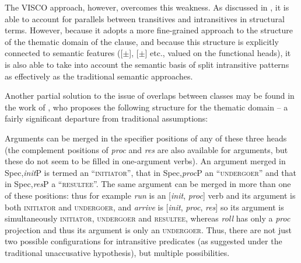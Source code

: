 \documentclass[output=paper]{langsci/langscibook}
\begin{document}
The VISCO approach, however, overcomes this weakness. As discussed in , it
is able to account for parallels between transitives and intransitives in
structural terms. However, because it adopts a more fine-grained approach to
the structure of the thematic domain of the clause, and because this structure
is explicitly connected to semantic features ([$\pm$\Volition{}],
[$\pm$\Initiation{}] etc., valued on the functional heads), it is also able to
take into account the semantic basis of split intransitive patterns as
effectively as the traditional semantic approaches.

Another partial solution to the issue of overlaps between classes may be found
in the work of \citet{Ramchand2008}, who proposes the following structure for
the thematic domain – a fairly significant departure from traditional
assumptions:

\ea
\z
Arguments can be merged in the specifier positions of any of these three heads
(the complement positions of \emph{proc} and \emph{res} are also available for
arguments, but these do not seem to be filled in one-argument verbs). An
argument merged in Spec,\emph{init}P is termed an \enquote{\textsc{initiator}},
that in Spec,\emph{proc}P an \enquote{\textsc{undergoer}} and that in
Spec,\emph{res}P a \enquote{\textsc{resultee}}. The same argument can be merged
in more than one of these positions: thus for example \emph{run} is an
[\emph{init}, \emph{proc}] verb and its argument is both \textsc{initiator} and
\textsc{undergoer}, and \emph{arrive} is [\emph{init}, \emph{proc}, \emph{res}]
so its argument is simultaneously \textsc{initiator},
\textsc{undergoer} and \textsc{resultee}, whereas
\emph{roll} has only a \emph{proc} projection and thus its argument is only
an \textsc{undergoer.} Thus, there are not just two possible configurations for
intransitive predicates (as suggested under the traditional unaccusative
hypothesis), but multiple possibilities.
\end{document}
